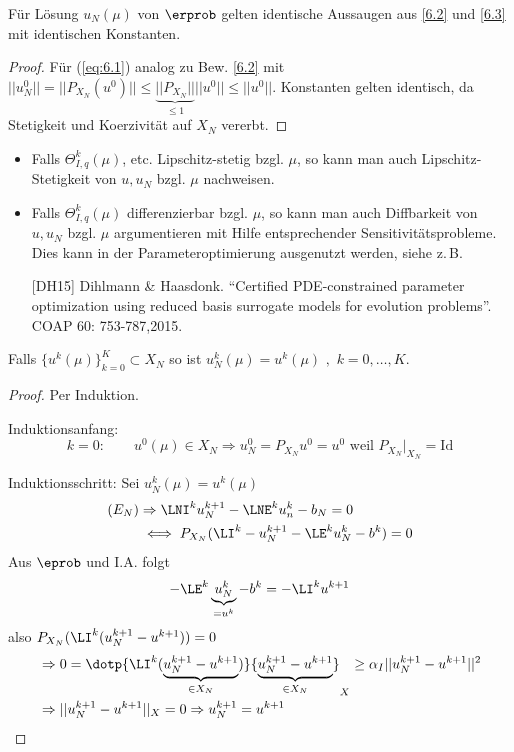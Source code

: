 \begin{kor}
Für Lösung $u_N(\mu)$ von $\erprob$ gelten identische Aussaugen aus \ref{6.2} und \ref{6.3} mit identischen Konstanten.
\begin{proof}
Für (\ref{eq:6.1}) analog zu Bew. \ref{6.2} mit $||u_N^0|| = ||P_{X_N}(u^0)|| \leq \underbrace{||P_{X_N}||}_{\leq 1} ||u^0|| \leq ||u^0||$. Konstanten gelten identisch, da Stetigkeit und Koerzivität auf $X_N$ vererbt.
\end{proof}
\end{kor}

\begin{bem} \beginwithlistbem
	\begin{itemize}
		\item Falls $\Theta_{I,q}^k(\mu)$, etc. Lipschitz-stetig bzgl. $\mu$, so kann man auch Lipschitz-Stetigkeit von $u, u_N$ bzgl. $\mu$ nachweisen.
		\item Falls $\Theta_{I,q}^k(\mu)$ differenzierbar bzgl. $\mu$, so kann man auch Diffbarkeit von $u, u_N$ bzgl. $\mu$ argumentieren mit Hilfe entsprechender Sensitivitätsprobleme. Dies kann in der Parameteroptimierung ausgenutzt werden, siehe z.\,B.
		
		[DH15] Dihlmann \& Haasdonk. ``Certified PDE-constrained parameter optimization using reduced basis surrogate models for evolution problems''. COAP 60: 753-787,2015.
	\end{itemize}
\end{bem}

\begin{satz} \label{6.6}
Falls $\{u^k(\mu)\}_{k=0}^K \subset X_N$ so ist $u_N^k(\mu) = u^k(\mu) \,\, , \,\, k=0,\dots,K$.
\begin{proof}
	Per Induktion.
	
	Induktionsanfang: 
	\[
	k=0: \qquad u^0(\mu) \in X_N \Rightarrow u_N^0 = P_{X_N}u^0 = u^0 \text{ weil } P_{X_N}\Big|_{X_N} = \text{Id}
	\]
	
	Induktionsschritt: Sei $u_N^k(\mu) = u^k(\mu)$
	\begin{align*}
		(E_N) &\Rightarrow \LNI^k u_N^{k+1} - \LNE^k u_n^k - b_N = 0 \\
		& \iff P_{X_N}(\LI^k - u_N^{k+1} - \LE^k u_N^k - b^k )= 0
	\end{align*}
	Aus $\eprob$ und I.A. folgt
	\[
		- \LE^k \underbrace{u_N^k}_{=u^k} - b^k = - \LI^k u^{k+1}
	\]
	also $P_{X_N}(\LI^k(u_N^{k+1} - u^{k+1}))=0$
	\begin{align*}
		&\Rightarrow 0 = \dotp{\LI^k(\underbrace{u_N^{k+1}-u^{k+1}}_{\in X_N})}{\underbrace{u_N^{k+1} - u^{k+1}}_{\in X_N}}_X \geq \alpha_I ||u_N^{k+1} - u^{k+1}||^2 \\
		&\Rightarrow ||u_N^{k+1} - u^{k+1}||_X = 0 \Rightarrow u_N^{k+1} = u^{k+1}
	\end{align*}
\end{proof}
\end{satz}


